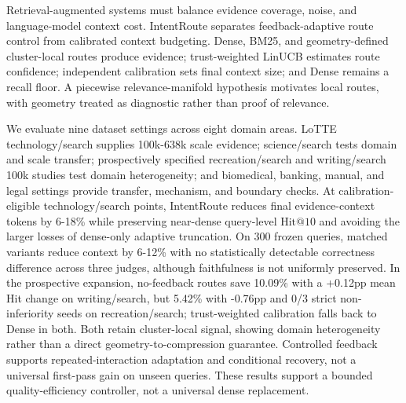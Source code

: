 
Retrieval-augmented systems must balance evidence coverage, noise, and language-model context cost. IntentRoute separates feedback-adaptive route control from calibrated context budgeting. Dense, BM25, and geometry-defined cluster-local routes produce evidence; trust-weighted LinUCB estimates route confidence; independent calibration sets final context size; and Dense remains a recall floor. A piecewise relevance-manifold hypothesis motivates local routes, with geometry treated as diagnostic rather than proof of relevance.

We evaluate nine dataset settings across eight domain areas. LoTTE technology/search supplies 100k-638k scale evidence; science/search tests domain and scale transfer; prospectively specified recreation/search and writing/search 100k studies test domain heterogeneity; and biomedical, banking, manual, and legal settings provide transfer, mechanism, and boundary checks. At calibration-eligible technology/search points, IntentRoute reduces final evidence-context tokens by 6-18\% while preserving near-dense query-level $\mathrm{Hit@10}$ and avoiding the larger losses of dense-only adaptive truncation. On 300 frozen queries, matched variants reduce context by 6-12\% with no statistically detectable correctness difference across three judges, although faithfulness is not uniformly preserved. In the prospective expansion, no-feedback routes save 10.09\% with a +0.12pp mean Hit change on writing/search, but 5.42\% with -0.76pp and 0/3 strict non-inferiority seeds on recreation/search; trust-weighted calibration falls back to Dense in both. Both retain cluster-local signal, showing domain heterogeneity rather than a direct geometry-to-compression guarantee. Controlled feedback supports repeated-interaction adaptation and conditional recovery, not a universal first-pass gain on unseen queries. These results support a bounded quality-efficiency controller, not a universal dense replacement.
